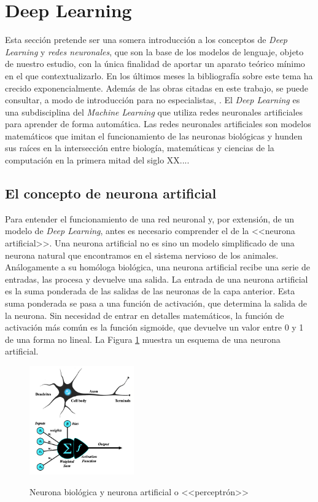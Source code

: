 \section{Deep Learning}

Esta sección pretende ser una somera introducción a los conceptos de \textit{Deep Learning} y \textit{redes neuronales}, que son la base de los modelos de lenguaje, objeto de nuestro estudio, con la única finalidad de aportar un aparato teórico mínimo en el que contextualizarlo. En los últimos meses la bibliografía sobre este tema ha crecido exponencialmente. Además de las obras citadas en este trabajo, se puede consultar, a modo de introducción para no especialistas, \cite{BeginnerGuideNeural}. El \textit{Deep Learning} es una subdisciplina del \textit{Machine Learning} que utiliza redes neuronales artificiales para aprender de forma automática. Las redes neuronales artificiales son modelos matemáticos que imitan el funcionamiento de las neuronas biológicas y hunden sus raíces en la intersección entre biología, matemáticas y ciencias de la computación en la primera mitad del siglo XX....

\subsection{El concepto de neurona artificial}

Para entender el funcionamiento de una red neuronal y, por extensión, de un modelo de \textit{Deep Learning}, antes es necesario comprender el de la <<neurona artificial>>. Una neurona artificial no es sino un modelo simplificado de una neurona natural que encontramos en el sistema nervioso de los animales. Análogamente a su homóloga biológica, una neurona artificial recibe una serie de entradas, las procesa y devuelve una salida. La entrada de una neurona artificial es la suma ponderada de las salidas de las neuronas de la capa anterior. Esta suma ponderada se pasa a una función de activación, que determina la salida de la neurona. Sin necesidad de entrar en detalles matemáticos, la función de activación más común es la función sigmoide, que devuelve un valor entre 0 y 1 de una forma no lineal. La Figura \ref{fig:neurona_artificial_natural} muestra un esquema de una neurona artificial. 

\begin{figure}[H]
    \caption[Neurona biológica y neurona artificial o <<perceptrón>>]{Neurona biológica y neurona artificial o <<perceptrón>>}
    \centering
    \includegraphics[width=0.4\textwidth]{./figuras/perceptron_with_neuron.png}
    \label{fig:neurona_artificial_natural}
\end{figure}

